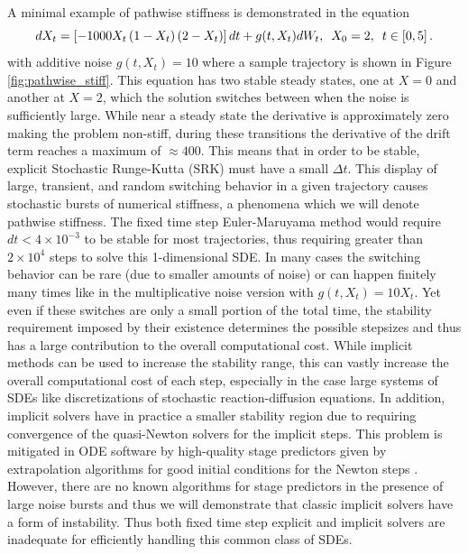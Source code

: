 \documentclass{article}
\begin{document}
A minimal example of pathwise stiffness is demonstrated in the equation
\begin{equation}
dX_{t}=\left[-1000X_{t}\left(1-X_{t}\right)\left(2-X_{t}\right)\right]dt+g(t,X_{t})dW_{t},\thinspace\thinspace\thinspace X_{0}=2,\thinspace\thinspace\thinspace t\in\left[0,5\right].\label{eq:pathwise_stiff}
\end{equation}
with additive noise $g(t,X_{t})=10$ where a sample trajectory is
shown in Figure \ref{fig:pathwise_stiff}. This equation has two stable
steady states, one at $X=0$ and another at $X=2$, which the solution
switches between when the noise is sufficiently large. While near
a steady state the derivative is approximately zero making the problem
non-stiff, during these transitions the derivative of the drift term
reaches a maximum of $\approx400$. This means that in order to be
stable, explicit Stochastic Runge-Kutta (SRK) must have a small $\Delta t$.
This display of large, transient, and random switching behavior in
a given trajectory causes stochastic bursts of numerical stiffness,
a phenomena which we will denote pathwise stiffness. The fixed time
step Euler-Maruyama method would require $dt<4\times10^{-3}$ to be
stable for most trajectories, thus requiring greater than $2\times10^{4}$
steps to solve this 1-dimensional SDE. In many cases the switching
behavior can be rare (due to smaller amounts of noise) or can happen
finitely many times like in the multiplicative noise version with
$g(t,X_{t})=10X_{t}$. Yet even if these switches are only a small
portion of the total time, the stability requirement imposed by their
existence determines the possible stepsizes and thus has a large contribution
to the overall computational cost. While implicit methods can be used
to increase the stability range, this can vastly increase the overall
computational cost of each step, especially in the case large systems
of SDEs like discretizations of stochastic reaction-diffusion equations.
In addition, implicit solvers have in practice a smaller stability
region due to requiring convergence of the quasi-Newton solvers for
the implicit steps. This problem is mitigated in ODE software by high-quality
stage predictors given by extrapolation algorithms for good initial
conditions for the Newton steps \cite{RN3790}. However, there are
no known algorithms for stage predictors in the presence of large
noise bursts and thus we will demonstrate that classic implicit solvers
have a form of instability. Thus both fixed time step explicit and
implicit solvers are inadequate for efficiently handling this common
class of SDEs.
\end{document}
